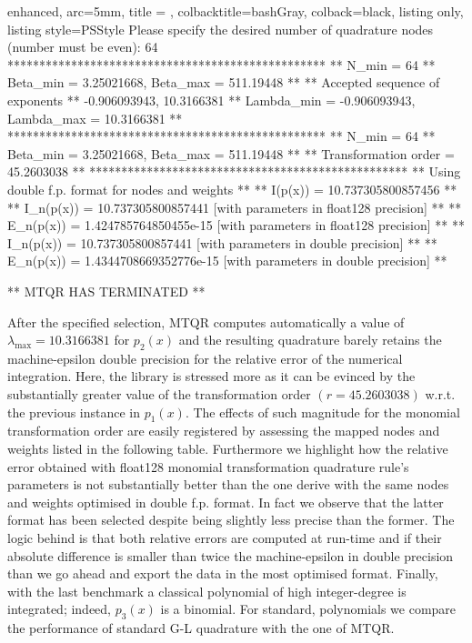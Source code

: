 \documentclass[a4paper, twosided]{book}
\begin{document}
\vspace{0.2cm}
\begin{tcblisting}{enhanced,
                   arc=5mm,
                   title = \color{black}{\large \ttfamily Building and executing the test driver: p\_2(x)},
                   colbacktitle=bashGray,
                   colback=black,
                   listing only,
                   listing style=PSStyle}
Please specify the desired number of quadrature nodes (number must be even): 64
 **************************************************
 ** N_min = 64
 ** Beta_min = 3.25021668, Beta_max = 511.19448 **
 ** Accepted sequence of exponents ** 
    {-0.906093943, 10.3166381}
 ** Lambda_min = -0.906093943, Lambda_max = 10.3166381 **
 **************************************************
 ** N_min = 64
 ** Beta_min = 3.25021668, Beta_max = 511.19448 **
 ** Transformation order = 45.2603038 **
 **************************************************
 ** Using double f.p. format for nodes and weights **
 ** I(p(x))   = 10.737305800857456 **
 ** I_n(p(x)) = 10.737305800857441     [with parameters in float128 precision] **
 ** E_n(p(x)) = 1.424785764850455e-15  [with parameters in float128 precision] **
 ** I_n(p(x)) = 10.737305800857441     [with parameters in double precision] **
 ** E_n(p(x)) = 1.4344708669352776e-15 [with parameters in double precision] **

 ** MTQR HAS TERMINATED **
\end{tcblisting}
\vspace{0.3cm}

\noindent
After the specified selection, MTQR computes automatically a value of $\lambda_{\text{max}} = 10.3166381$ for $p_2(x)$ and the resulting quadrature barely retains the machine-epsilon double precision for the relative error of the numerical integration. Here, the library is stressed more as it can be evinced by the substantially greater value of the transformation order $(r=45.2603038)$ w.r.t. the previous instance in $p_1(x)$. The effects of such magnitude for the monomial transformation order are easily registered by assessing the mapped nodes and weights listed in the following table. Furthermore we highlight how the relative error obtained with \colorbox{poliGrayBlue}{float128} monomial transformation quadrature rule's parameters is not substantially better than the one derive with the same nodes and weights optimised in double f.p. format. In fact we observe that the latter format has been selected despite being slightly less precise than the former. The logic behind is that both relative errors are computed at run-time and if their absolute difference is smaller than twice the machine-epsilon in double precision than we go ahead and export the data in the most optimised format. Finally, with the last benchmark a classical polynomial of high integer-degree is integrated; indeed, $p_3(x)$ is a binomial. For standard, polynomials we compare the performance of standard  G-L quadrature with the one of MTQR.
\end{document}
